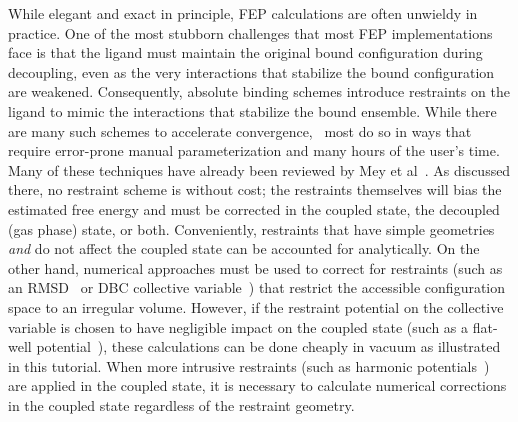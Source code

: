 \documentclass[9pt,tutorial,pubversion]{Styling/livecoms}
\begin{document}
While elegant and exact in principle, FEP calculations are often unwieldy in practice.
One of the most stubborn challenges that most FEP implementations face is that the ligand must maintain the original bound configuration during decoupling, even as the very interactions that stabilize the bound configuration are weakened.
Consequently, absolute binding schemes introduce restraints on the ligand to mimic the interactions that stabilize the bound ensemble. 
While there are many such schemes to accelerate convergence,~\cite{Henin2017, Hermans1997, Boresch2003, Fu2017} most do so in ways that require error-prone manual parameterization and many hours of the user's time.
Many of these techniques have already been reviewed by Mey et al~\cite{Mey2020}. 
As discussed there, no restraint scheme is without cost; the restraints themselves will bias the estimated free energy and must be corrected in the coupled state, the decoupled (gas phase) state, or both.
Conveniently, restraints that have simple geometries \textit{and} do not affect the coupled state can be accounted for analytically. 
On the other hand, numerical approaches must be used to correct for restraints (such as an RMSD~\cite{Fu2017} or DBC collective variable~\cite{Salari2018}) that restrict the accessible configuration space to an irregular volume. However, if the restraint potential on the collective variable is chosen to have negligible impact on the coupled state (such as a flat-well potential~\cite{Helms1995}), %
these calculations can be done cheaply in vacuum as illustrated in this tutorial. When more intrusive restraints (such as harmonic potentials~\cite{Boresch2003, Fu2017}) are applied in the coupled state, it is necessary to calculate numerical corrections in the coupled state regardless of the restraint geometry.
\end{document}
